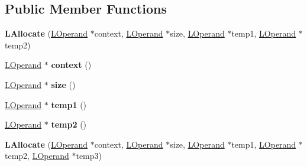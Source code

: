 \subsection*{Public Member Functions}
\begin{DoxyCompactItemize}
\item 
{\bfseries L\+Allocate} (\hyperlink{classv8_1_1internal_1_1_l_operand}{L\+Operand} $\ast$context, \hyperlink{classv8_1_1internal_1_1_l_operand}{L\+Operand} $\ast$size, \hyperlink{classv8_1_1internal_1_1_l_operand}{L\+Operand} $\ast$temp1, \hyperlink{classv8_1_1internal_1_1_l_operand}{L\+Operand} $\ast$temp2)\hypertarget{classv8_1_1internal_1_1_l_allocate_a45d86b0f120cf9be52d2bbd0494683af}{}\label{classv8_1_1internal_1_1_l_allocate_a45d86b0f120cf9be52d2bbd0494683af}

\item 
\hyperlink{classv8_1_1internal_1_1_l_operand}{L\+Operand} $\ast$ {\bfseries context} ()\hypertarget{classv8_1_1internal_1_1_l_allocate_a8e8d6f1d4913d84b1ecf49b67200b7a5}{}\label{classv8_1_1internal_1_1_l_allocate_a8e8d6f1d4913d84b1ecf49b67200b7a5}

\item 
\hyperlink{classv8_1_1internal_1_1_l_operand}{L\+Operand} $\ast$ {\bfseries size} ()\hypertarget{classv8_1_1internal_1_1_l_allocate_a39b42c01160d1f69ebea869bc4b92efe}{}\label{classv8_1_1internal_1_1_l_allocate_a39b42c01160d1f69ebea869bc4b92efe}

\item 
\hyperlink{classv8_1_1internal_1_1_l_operand}{L\+Operand} $\ast$ {\bfseries temp1} ()\hypertarget{classv8_1_1internal_1_1_l_allocate_a61237f94d30caf1437601ac509815068}{}\label{classv8_1_1internal_1_1_l_allocate_a61237f94d30caf1437601ac509815068}

\item 
\hyperlink{classv8_1_1internal_1_1_l_operand}{L\+Operand} $\ast$ {\bfseries temp2} ()\hypertarget{classv8_1_1internal_1_1_l_allocate_ac6d5be0b7ea0bdf9554a0a6921c3a70d}{}\label{classv8_1_1internal_1_1_l_allocate_ac6d5be0b7ea0bdf9554a0a6921c3a70d}

\item 
{\bfseries L\+Allocate} (\hyperlink{classv8_1_1internal_1_1_l_operand}{L\+Operand} $\ast$context, \hyperlink{classv8_1_1internal_1_1_l_operand}{L\+Operand} $\ast$size, \hyperlink{classv8_1_1internal_1_1_l_operand}{L\+Operand} $\ast$temp1, \hyperlink{classv8_1_1internal_1_1_l_operand}{L\+Operand} $\ast$temp2, \hyperlink{classv8_1_1internal_1_1_l_operand}{L\+Operand} $\ast$temp3)\hypertarget{classv8_1_1internal_1_1_l_allocate_af041bf760de38cbfecde9c79f5c9dece}{}\label{classv8_1_1internal_1_1_l_allocate_af041bf760de38cbfecde9c79f5c9dece}


\end{DoxyCompactItemize}
